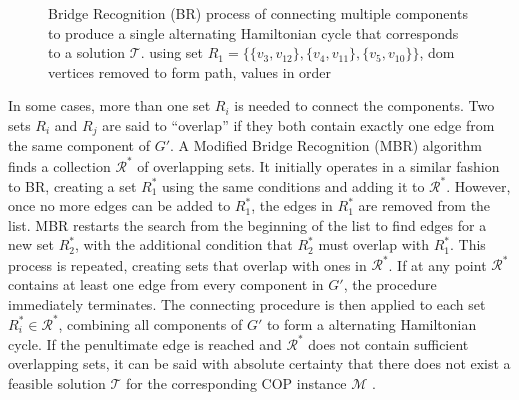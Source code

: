 \documentclass{elsarticle}
\begin{document}
\begin{figure}[H]	
	\centering
	\begin{subfigure}[h]{0.25\textwidth}
		
		\label{fig:mpsconnect}
	\end{subfigure} \hspace{5mm} %
	\begin{subfigure}[h]{0.25\textwidth}
		
		\label{fig:mpscycle}
	\end{subfigure} \hspace{5mm}
	\begin{subfigure}[h]{0.25\textwidth}
		
		\label{fig:mpspath}
	\end{subfigure}
	\caption{Bridge Recognition (BR) process of connecting multiple components to produce a single alternating Hamiltonian cycle that corresponds to a solution $\mathcal{T}$. \alert{using set $R_1 = \{\{v_3, v_{12}\}, \{v_4, v_{11}\}, \{v_5, v_{10}\}\}$, dom vertices removed to form path, values in order}}
	\label{fig:br}
\end{figure}

In some cases, more than one set $R_i$ is needed to connect the components. Two sets $R_i$ and $R_j$ are said to ``overlap'' if they both contain exactly one edge from the same component of $G'$. A Modified Bridge Recognition (MBR) algorithm finds a collection $\mathcal{R}^*$ of overlapping sets. It initially operates in a similar fashion to BR, creating a set $R^{*}_1$ using the same conditions and adding it to $\mathcal{R}^*$. However, once no more edges can be added to $R^{*}_1$, the edges in $R^{*}_1$ are removed from the list. MBR restarts the search from the beginning of the list to find edges for a new set $R^{*}_2$, with the additional condition that $R^{*}_2$ must overlap with $R^{*}_1$. This process is repeated, creating sets that overlap with ones in $\mathcal{R}^*$. If at any point $\mathcal{R}^*$ contains at least one edge from every component in $G'$, the procedure immediately terminates. The connecting procedure is then applied to each set $R^{*}_i \in \mathcal{R}^*$, combining all components of $G'$ to form a alternating Hamiltonian cycle. If the penultimate edge is reached and $\mathcal{R}^*$ does not contain sufficient overlapping sets, it can be said with absolute certainty that there does not exist a feasible solution $\mathcal{T}$ for the corresponding COP instance $\mathcal{M}$ \cite{hawa2018}.
\end{document}
